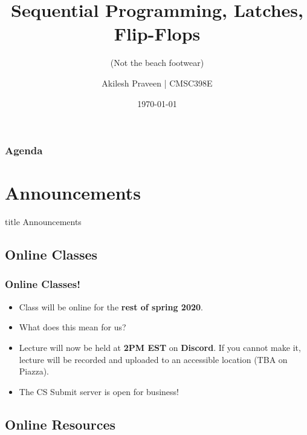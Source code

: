 \documentclass{beamer}
\title{Sequential Programming, Latches, Flip-Flops}
\subtitle{(Not the beach footwear)}
\author[CMSC389E]{Akilesh Praveen | CMSC398E}
\institute{UMD}
\date{\today}
\begin{document}
    \begin{frame}
        \titlepage
    \end{frame}
    
    \begin{frame}
        \frametitle{Agenda}
        \tableofcontents
    \end{frame}
    
    \section{Announcements}
    
        \begin{frame}
                \vfill
                \centering
                \begin{beamercolorbox}[sep=8pt,center,shadow=true,rounded=true]{title}
                    Announcements\par%
                \end{beamercolorbox}
                \vfill
             \end{frame}
    
        \subsection{Online Classes}
        
            
            
            \begin{frame}
                \frametitle{Online Classes!}
                \begin{itemize}
                    \item Class will be online for the \textbf{rest of spring 2020}.
                    \item What does this mean for us?
                    \item Lecture will now be held at \textbf{2PM EST} on \textbf{Discord}. If you cannot make it, lecture will be recorded and uploaded to an accessible location (TBA on Piazza).
                    \item The CS Submit server is open for business!
                    
                \end{itemize}
            \end{frame}
            
        \subsection{Online Resources}
            
\end{document}
